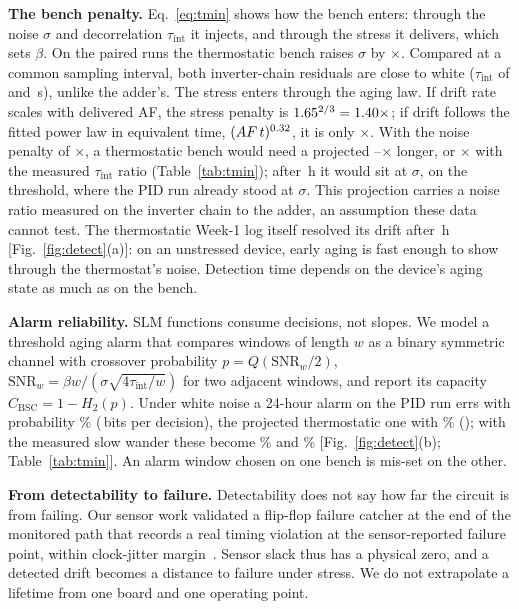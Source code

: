 \documentclass[10pt,twocolumn]{article}
\newcommand{\tint}{\tau_{\mathrm{int}}}
\begin{document}
\textbf{The bench penalty.} Eq.~\eqref{eq:tmin} shows how the bench enters: through the noise $\sigma$ and decorrelation $\tint$ it injects, and through the stress it delivers, which sets $\beta$. On the paired runs the thermostatic bench raises $\sigma$ by \vSigRawRatio$\times$. Compared at a common sampling interval, both inverter-chain residuals are close to white ($\tint$ of \vTauBBs{} and \vTauPIDs\,s), unlike the adder's. The stress enters through the aging law. If drift rate scales with delivered AF, the stress penalty is $1.65^{2/3}=1.40\times$; if drift follows the fitted power law in equivalent time, $(AF\,t)^{0.32}$, it is only \vPenStressPow$\times$. With the noise penalty of \vPenNoiseSigOnly$\times$, a thermostatic bench would need a projected \vPenLow--\vPenMid$\times$ longer, or \vPenHigh$\times$ with the measured $\tint$ ratio (Table~\ref{tab:tmin}); after \vDurPairPost\,h it would sit at \vSeqZbb$\sigma$, on the threshold, where the PID run already stood at \vSeqZpid$\sigma$. This projection carries a noise ratio measured on the inverter chain to the adder, an assumption these data cannot test. The thermostatic Week-1 log itself resolved its drift after \vTminSeqBBlong\,h [Fig.~\ref{fig:detect}(a)]: on an unstressed device, early aging is fast enough to show through the thermostat's noise. Detection time depends on the device's aging state as much as on the bench.

\textbf{Alarm reliability.} SLM functions consume decisions, not slopes. We model a threshold aging alarm that compares windows of length $w$ as a binary symmetric channel with crossover probability $p=Q(\mathrm{SNR}_w/2)$, $\mathrm{SNR}_w=\beta w/(\sigma\sqrt{4\tint/w})$ for two adjacent windows, and report its capacity $C_{\mathrm{BSC}}=1-H_2(p)$. Under white noise a 24-hour alarm on the PID run errs with probability \vPerrPidBound\% (\vCpidBound\,bits per decision), the projected thermostatic one with \vPerrBbBound\% (\vCbbBound); with the measured slow wander these become \vPerrPidLrv\% and \vPerrBbLrv\% [Fig.~\ref{fig:detect}(b); Table~\ref{tab:tmin}]. An alarm window chosen on one bench is mis-set on the other.

\textbf{From detectability to failure.} Detectability does not say how far the circuit is from failing. Our sensor work validated a flip-flop failure catcher at the end of the monitored path that records a real timing violation at the sensor-reported failure point, within clock-jitter margin~\cite{sbcci25}. Sensor slack thus has a physical zero, and a detected drift becomes a distance to failure under stress. We do not extrapolate a lifetime from one board and one operating point.
\end{document}
